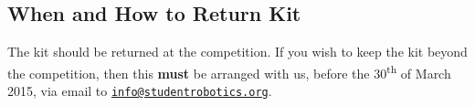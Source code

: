 \subsection {When and How to Return Kit}

The kit should be returned at the competition.
If you wish to keep the kit beyond the competition, then this \textbf{must} be arranged with us,
 before the 30\textsuperscript{th} of March 2015, via email to \href{mailto:info@studentrobotics.org}{\nolinkurl{info@studentrobotics.org}}.
